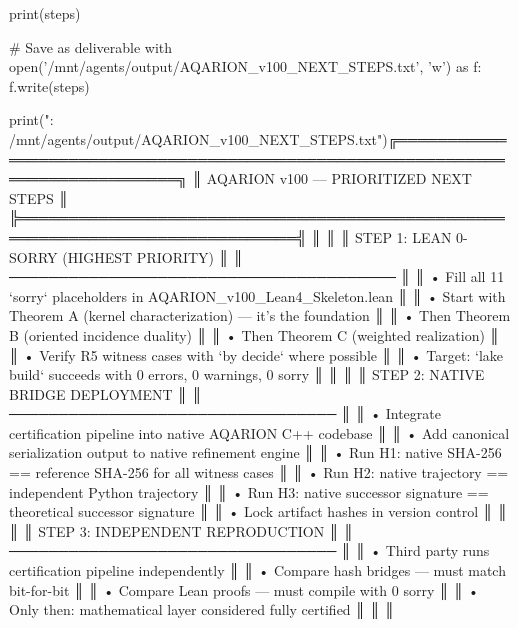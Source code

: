 print(steps)

# Save as deliverable
with open('/mnt/agents/output/AQARION_v100_NEXT_STEPS.txt', 'w') as f:
    f.write(steps)

print("\nSaved: /mnt/agents/output/AQARION_v100_NEXT_STEPS.txt")╔══════════════════════════════════════════════════════════════════════════════╗
║                    AQARION v100 — PRIORITIZED NEXT STEPS                     ║
╠══════════════════════════════════════════════════════════════════════════════╣
║                                                                              ║
║  STEP 1: LEAN 0-SORRY (HIGHEST PRIORITY)                                     ║
║  ───────────────────────────────────────                                     ║
║  • Fill all 11 `sorry` placeholders in AQARION_v100_Lean4_Skeleton.lean      ║
║  • Start with Theorem A (kernel characterization) — it's the foundation      ║
║  • Then Theorem B (oriented incidence duality)                               ║
║  • Then Theorem C (weighted realization)                                     ║
║  • Verify R5 witness cases with `by decide` where possible                   ║
║  • Target: `lake build` succeeds with 0 errors, 0 warnings, 0 sorry        ║
║                                                                              ║
║  STEP 2: NATIVE BRIDGE DEPLOYMENT                                            ║
║  ─────────────────────────────────                                           ║
║  • Integrate certification pipeline into native AQARION C++ codebase         ║
║  • Add canonical serialization output to native refinement engine            ║
║  • Run H1: native SHA-256 == reference SHA-256 for all witness cases        ║
║  • Run H2: native trajectory == independent Python trajectory              ║
║  • Run H3: native successor signature == theoretical successor signature   ║
║  • Lock artifact hashes in version control                                   ║
║                                                                              ║
║  STEP 3: INDEPENDENT REPRODUCTION                                            ║
║  ─────────────────────────────────                                           ║
║  • Third party runs certification pipeline independently                     ║
║  • Compare hash bridges — must match bit-for-bit                           ║
║  • Compare Lean proofs — must compile with 0 sorry                           ║
║  • Only then: mathematical layer considered fully certified                ║
║                                                                              ║
